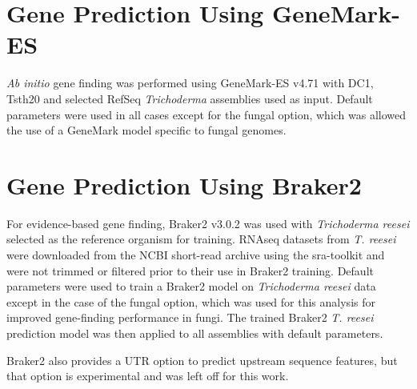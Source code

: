 \section{Gene Prediction Using GeneMark-ES}
\label{met:genemark}


\textit{Ab initio} gene finding was performed using GeneMark-ES
v4.71\cite{Borodovsky2011} with DC1, Tsth20 and selected RefSeq
\textit{Trichoderma} assemblies used as input. Default parameters were
used in all cases except for the fungal option, which was allowed the
use of a GeneMark model specific to fungal genomes.

%

\section{Gene Prediction Using Braker2}
\label{met:braker2}

For evidence-based gene finding, Braker2 v3.0.2\cite{Bruna2021} was
used with \textit{Trichoderma reesei} selected as the reference
organism for training. RNAseq datasets from \textit{T. reesei} were
downloaded from the NCBI short-read archive using the
sra-toolkit\cite{NCBI2025} and were not trimmed or filtered prior to
their use in Braker2 training. Default parameters were used to train a
Braker2 model on \textit{Trichoderma reesei} data except in the case
of the fungal option, which was used for this analysis for improved
gene-finding performance in fungi. The trained Braker2
\textit{T. reesei} prediction model was then applied to all assemblies
with default parameters.

Braker2 also provides a UTR option to predict upstream sequence
features, but that option is experimental and was left off for this
work.



